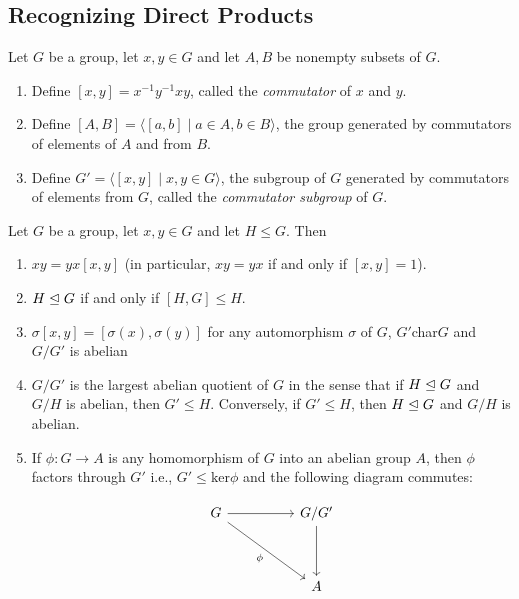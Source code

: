 \documentclass[../main]{subfiles}
\begin{document}
\subsection{Recognizing Direct Products}


\begin{dfn}
 Let $G$ be a group, let $x,y \in G$ and let $A, B$ be nonempty subsets of $G$. 
 \begin{enumerate}
  \item Define $[x,y] = x^{-1}y^{-1}xy$, called the \textit{commutator} of $x$ and $y$.
  \item Define $[A,B] = \langle [a,b] \mid a \in A, b\in B \rangle$, the group generated by commutators of elements of $A$ and from $B$.
  \item Define $G' = \langle [x,y] \mid x,y \in G \rangle$, the subgroup of $G$ generated by commutators of elements from $G$, called the \textit{commutator subgroup} of $G$.
 \end{enumerate}
\end{dfn}


\begin{prop}
 Let $G$ be a group, let $x,y \in G$ and let $H \leq G$. Then 
 \begin{enumerate}
  \item $xy = yx[x,y]$ (in particular, $xy = yx$ if and only if $[x,y] =1 $).
  
  \item $H \trianglelefteq G$ if and only if $[H,G] \leq H$.
  
  \item $\sigma [x,y] = [ \sigma(x), \sigma(y)]$ for any automorphism $\sigma$ of $G$, $G'$char$G$ and $G/G'$ is abelian
  
  \item  $G/G'$ is the largest abelian quotient of $G$ in the sense that if $H \trianglelefteq G$ and $G/H$ is abelian, then $G' \leq H$. Conversely, if $G' \leq H$, then $H \trianglelefteq G$ and $G/H$ is abelian.
  
  \item If $\phi \colon G \to A$ is any homomorphism of $G$ into an abelian group $A$, then $\phi$ factors through $G'$ i.e., $G' \leq \text{ker}\phi$ and the following diagram commutes:
  
\[\begin{tikzcd}
	G && {G/G'} \\
	\\
	&& A
	\arrow[from=1-1, to=1-3]
	\arrow["\phi"', from=1-1, to=3-3]
	\arrow[from=1-3, to=3-3]
\end{tikzcd}\]
 \end{enumerate}
\end{prop}
\end{document}

